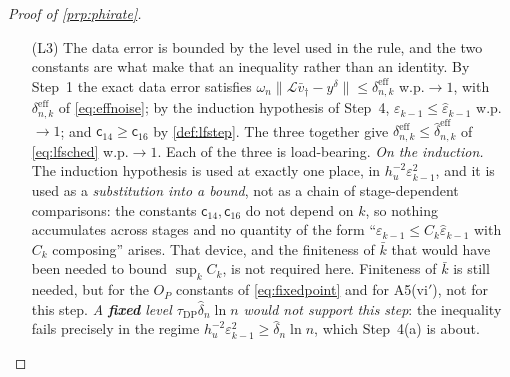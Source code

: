 \begin{proof}[Proof of \cref{prp:phirate}]
\begin{enumerate}
{direction}, so ``$\bar v_\dagger\in\mathcal R\big((\hat{\mathcal A}^{\ast}\hat{\mathcal A})^{\mu}\big)\cap\mathcal S_n$''
and ``$\bar v_\dagger\in\mathcal R\big((\hat{\mathcal P}^{\,\mathcal S})^{\mu}\big)$'' are different
statements: $\hat{\mathcal A}^{\ast}\hat{\mathcal A}$ need not preserve $\mathcal S_n$, and
$\hat{\mathcal P}^{\,\mathcal S}$ is a different operator on $\mathcal S_n$ from
$\hat{\mathcal A}^{\ast}\hat{\mathcal A}\vert_{\mathcal S_n}$ unless it does. (P-a.3) states the
hypothesis at \eqref{eq:compress}, so the two agree, and \cref{lem:scaleinv}(iii), stated for a single
fixed domain and handling only the scalar rescaling, is not asked to bridge a gap it cannot bridge.
\item[(L3)] The data error is bounded by the level used in the rule, and the two constants are
what make that an inequality rather than an identity. By Step~1 the exact data error satisfies
$\omega_n\|\mathcal L\bar v_\dagger-y^\delta\|\le\delta^{\mathrm{eff}}_{n,k}$ w.p.$\to1$, with
$\delta^{\mathrm{eff}}_{n,k}$ of \eqref{eq:effnoise}; by the induction hypothesis of Step~4,
$\varepsilon_{k-1}\le\hat\varepsilon_{k-1}$ w.p.$\to1$; and $\mathsf c_{14}\ge\mathsf c_{16}$ by
\cref{def:lfstep}. The three together give
$\delta^{\mathrm{eff}}_{n,k}\le\hat\delta^{\mathrm{eff}}_{n,k}$ of \eqref{eq:lfsched} w.p.$\to1$.
Each of the three is load-bearing.
\emph{On the induction.}
The induction hypothesis is used at exactly one place, in $h_u^{-2}\varepsilon_{k-1}^{2}$, and it is used as
a \emph{substitution into a bound}, not as a chain of stage-dependent comparisons: the constants
$\mathsf c_{14},\mathsf c_{16}$ do not depend on $k$, so nothing accumulates across stages and no
quantity of the form ``$\varepsilon_{k-1}\le C_k\hat\varepsilon_{k-1}$ with $C_k$ composing'' arises. That
device, and the finiteness of $\bar k$ that would have been needed to bound $\sup_kC_k$, is not
required here. Finiteness of $\bar k$ is still needed, but for the $O_P$ constants of
\eqref{eq:fixedpoint} and for A5(vi$'$), not for this step.
\emph{A \textbf{fixed} level $\tau_{\mathrm{DP}}\hat\delta_n\ln n$ would not support this step}: the
inequality fails precisely in the regime
$h_u^{-2}\varepsilon_{k-1}^{2}\ge\hat\delta_n\ln n$, which Step~4(a) is about.

\end{enumerate}
\end{proof}
